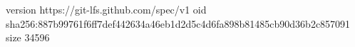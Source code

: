 version https://git-lfs.github.com/spec/v1
oid sha256:887b99761f6ff7def442634a46eb1d2d5c4d6fa898b81485cb90d36b2c857091
size 34596
